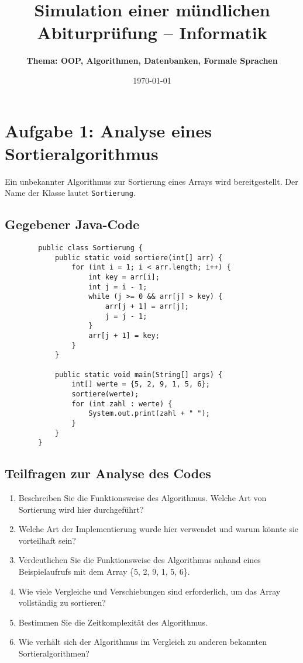 \documentclass[a4paper,12pt]{article}
\begin{document}
	
	\title{\textbf{Simulation einer mündlichen Abiturprüfung -- Informatik}}
	\author{\textbf{Thema: OOP, Algorithmen, Datenbanken, Formale Sprachen}}
	\date{\today}
	\maketitle
	
	\section*{Aufgabe 1: Analyse eines Sortieralgorithmus}
	
	Ein unbekannter Algorithmus zur Sortierung eines Arrays wird bereitgestellt. Der Name der Klasse lautet \texttt{Sortierung}.
	
	\subsection*{Gegebener Java-Code}
	
	\begin{verbatim}
		public class Sortierung {
			public static void sortiere(int[] arr) {
				for (int i = 1; i < arr.length; i++) {
					int key = arr[i];
					int j = i - 1;
					while (j >= 0 && arr[j] > key) {
						arr[j + 1] = arr[j];
						j = j - 1;
					}
					arr[j + 1] = key;
				}
			}
			
			public static void main(String[] args) {
				int[] werte = {5, 2, 9, 1, 5, 6};
				sortiere(werte);
				for (int zahl : werte) {
					System.out.print(zahl + " ");
				}
			}
		}
	\end{verbatim}
	
	\subsection*{Teilfragen zur Analyse des Codes}
	
	\begin{enumerate}
		\item Beschreiben Sie die Funktionsweise des Algorithmus. Welche Art von Sortierung wird hier durchgeführt?
		\item Welche Art der Implementierung wurde hier verwendet und warum könnte sie vorteilhaft sein?
		\item Verdeutlichen Sie die Funktionsweise des Algorithmus anhand eines Beispielaufrufs mit dem Array \{5, 2, 9, 1, 5, 6\}.
		\item Wie viele Vergleiche und Verschiebungen sind erforderlich, um das Array vollständig zu sortieren?
		\item Bestimmen Sie die Zeitkomplexität des Algorithmus.
		\item Wie verhält sich der Algorithmus im Vergleich zu anderen bekannten Sortieralgorithmen?
	\end{enumerate}
	
\end{document}
